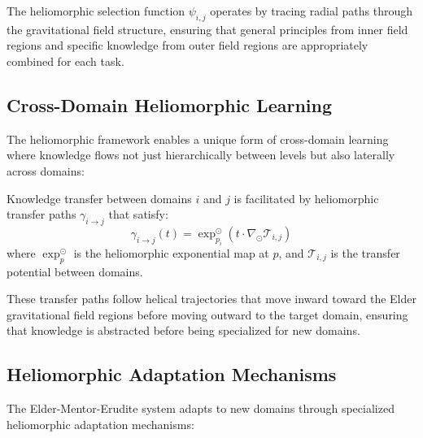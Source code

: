 The heliomorphic selection function $\psi_{i,j}$ operates by tracing radial paths through the gravitational field structure, ensuring that general principles from inner field regions and specific knowledge from outer field regions are appropriately combined for each task.

\subsection{Cross-Domain Heliomorphic Learning}

The heliomorphic framework enables a unique form of cross-domain learning where knowledge flows not just hierarchically between levels but also laterally across domains:

\begin{theorem}
Knowledge transfer between domains $i$ and $j$ is facilitated by heliomorphic transfer paths $\gamma_{i \to j}$ that satisfy:
\begin{equation}
\gamma_{i \to j}(t) = \exp_{p_i}^{\odot}\left(t \cdot \nabla_{\odot} \mathcal{T}_{i,j}\right)
\end{equation}
where $\exp_{p}^{\odot}$ is the heliomorphic exponential map at $p$, and $\mathcal{T}_{i,j}$ is the transfer potential between domains.
\end{theorem}

These transfer paths follow helical trajectories that move inward toward the Elder gravitational field regions before moving outward to the target domain, ensuring that knowledge is abstracted before being specialized for new domains.

\subsection{Heliomorphic Adaptation Mechanisms}

The Elder-Mentor-Erudite system adapts to new domains through specialized heliomorphic adaptation mechanisms:

